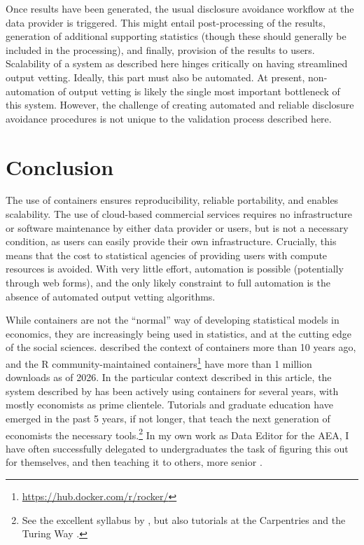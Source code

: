 \documentclass[12pt]{article}
\begin{document}

Once results have been generated, the usual disclosure avoidance workflow at the data provider is triggered. This might entail post-processing of the results, generation of additional supporting statistics (though these should generally be included in the processing), and finally, provision of the results to users. 
%
Scalability of a system as described here hinges critically on having streamlined output vetting. Ideally, this  part must also be automated. At present, non-automation of output vetting is likely the single most important bottleneck of this system. However, the challenge of creating automated and reliable disclosure avoidance procedures is  not unique to the validation process described here.


\section{Conclusion}

The use of containers ensures reproducibility, reliable portability, and enables scalability. The use of cloud-based commercial services requires no infrastructure or software maintenance by either data provider or users, but is not a necessary condition, as users can easily provide their own infrastructure. Crucially, this means that the cost to statistical agencies of providing users with compute resources is avoided. With very little effort, automation is possible (potentially through web forms), and the only likely constraint to full automation is the absence of automated output vetting algorithms. 

While containers are not the ``normal'' way of developing statistical models in economics, they are increasingly being used in statistics, and at the cutting edge of the social sciences. \citet{boettiger_introduction_2015} described the context of containers more  than 10 years ago, and the R community-maintained containers\footnote{\url{https://hub.docker.com/r/rocker/}} have more than 1 million downloads as of 2026. In the particular context described in this article, the system described by \citet{guimaraes_reproducibility_2023} has been actively using containers for several years, with mostly economists as  prime clientele. Tutorials and graduate education have emerged in the past 5 years, if not longer, that teach the next generation of economists the necessary tools.\footnote{See the excellent syllabus by \citet{mcdermott2021}, but also tutorials at the Carpentries \citep{eyers_reproducible_2020} and the Turing Way \citep{the_turing_way_community_containers_2024}.} In my own work as Data Editor for the \ac{AEA}, I have often successfully delegated to  undergraduates the task of figuring this out for themselves, and then teaching it to others, more senior \citep{graham2025}.
\end{document}
